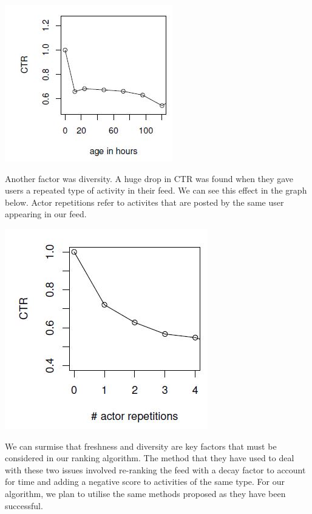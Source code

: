 \begin{center}
  \includegraphics[scale=0.8]{images/freshness.jpg}
\end{center}

Another factor was diversity. A huge drop in CTR was found when they gave users a repeated type of activity in their feed. We can see this effect in the graph below. Actor repetitions refer to activites that are posted by the same user appearing in our feed.

\begin{center}
  \includegraphics[scale=0.8]{images/diversity.jpg}
\end{center}

We can surmise that freshness and diversity are key factors that must be considered in our ranking algorithm. The method that they have used to deal with these two issues involved re-ranking the feed with a decay factor to account for time and adding a negative score to activities of the same type. For our algorithm, we plan to utilise the same methods proposed as they have been successful.

